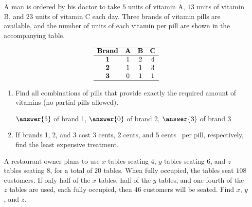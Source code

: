 \documentclass{ximera}
\begin{document}
\begin{problem}\label{prb:pills}
A man is ordered by his doctor to take $5$ units of vitamin A, $13$ units of vitamin B, and $23$ units of vitamin C each day. Three brands of vitamin pills are available, and the number of units of each vitamin per pill are shown in the accompanying table.

$$
\begin{array}{cccc}
\hline
		\textbf{Brand} &  \textbf{A} & \textbf{B} & \textbf{C} \\ \hline
		\textbf{1} & 1 & 2 & 4 \\
		\textbf{2} & 1 & 1 & 3 \\
		\textbf{3} & 0 & 1 & 1 \\ \hline
 \end{array}
$$

\begin{enumerate}
\item Find all combinations of pills that provide exactly the required amount of vitamins (no partial pills allowed).

$\answer{5}$ of brand 1, $\answer{0}$ of brand 2, $\answer{3}$ of brand 3

\item If brands 1, 2, and 3 cost 3 cents, 2 cents, and 5 cents \ per pill, respectively, find the least expensive treatment.


\end{enumerate}
\end{problem}

\begin{problem}\label{prb:tables}
A restaurant owner plans to use $x$ tables seating $4$, $y$ tables seating $6$, and $z$ tables seating $8$, for a total of $20$ tables. When fully occupied, the tables seat $108$ customers. If only half of the $x$ tables, half of the $y$ tables, and one-fourth of the $z$ tables are used, each fully occupied, then $46$ customers will be seated. Find $x$, $y$, and $z$.

\end{problem}
\end{document}

